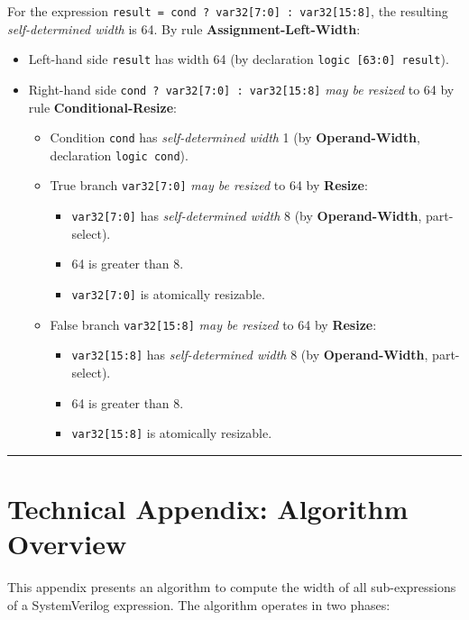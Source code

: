 \documentclass{article}
\newcommand{\sv}[1]{\texttt{#1}}
\newcommand{\sds}{\emph{self-determined width}}
\newcommand{\mbr}{\emph{may be resized}}
\begin{document}
For the expression \sv{result = cond ? var32[7:0] : var32[15:8]}, the
resulting \sds{} is 64. By rule \textbf{Assignment-Left-Width}:
\begin{itemize}
  \item Left-hand side \sv{result} has width 64 (by
    declaration \sv{logic [63:0] result}).
  \item Right-hand side \sv{cond ? var32[7:0] : var32[15:8]}
    \mbr{} to 64 by rule \textbf{Conditional-Resize}:
    \begin{itemize}
      \item Condition \sv{cond} has \sds{} 1 (by
        \textbf{Operand-Width}, declaration \sv{logic cond}).
      \item True branch \sv{var32[7:0]} \mbr{} to 64 by
        \textbf{Resize}:
        \begin{itemize}
          \item \sv{var32[7:0]} has \sds{} 8 (by
            \textbf{Operand-Width}, part-select).
          \item 64 is greater than 8.
          \item \sv{var32[7:0]} is atomically resizable.
        \end{itemize}
      \item False branch \sv{var32[15:8]} \mbr{} to 64 by
        \textbf{Resize}:
        \begin{itemize}
          \item \sv{var32[15:8]} has \sds{} 8 (by
            \textbf{Operand-Width}, part-select).
          \item 64 is greater than 8.
          \item \sv{var32[15:8]} is atomically resizable.
        \end{itemize}
    \end{itemize}
\end{itemize}

\begin{center}
  \noindent\rule{.8\textwidth}{1pt}
\end{center}

\appendix
\section{Technical Appendix: Algorithm Overview}
\label{algorithm-overview}

This appendix presents an algorithm to compute the width of all sub-expressions
of a SystemVerilog expression. The algorithm operates in two phases:
\end{document}
